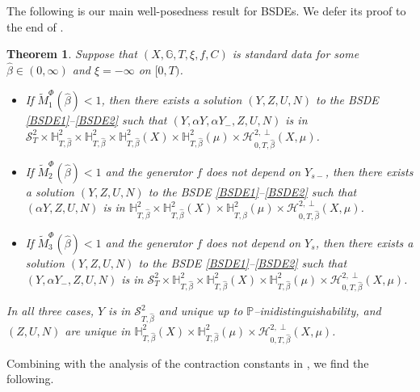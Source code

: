 \documentclass[10pt]{article} %
\newtheorem{theorem}{Theorem}[section]
\newcommand\cH{\mathcal H}
\newcommand\cS{\mathcal S}
\def \G{\mathbb{G}}
\def \H{\mathbb{H}}
\def \P{\mathbb{P}}
\newcommand{\1}{\mathbf{1}}
\begin{document}
The following is our main well-posedness result for BSDEs. We defer its proof to the end of .


\begin{theorem}\label{thm::main_bsde}
	Suppose that $(X,\G,T,\xi,f,C)$ is standard data for some $\hat\beta \in (0,\infty)$ and $\xi = -\infty$ on $[0,T)$.
	
	\begin{itemize}
	\item[$(i)$] If $\widetilde M_1^\Phi(\hat\beta) < 1$, then there exists a solution $(Y,Z,U,N)$ to the {\rm BSDE} \ref{BSDE1}--\ref{BSDE2} such that $(Y,\alpha Y,\alpha Y_-,Z,U,N)$ is in $\cS^2_T \times \H^2_{T,\hat\beta} \times \H^2_{T,\hat\beta} \times \H^2_{T,\hat\beta}(X) \times \H^2_{T,\hat\beta}(\mu) \times \cH^{2,\perp}_{0,T,\hat\beta}(X,\mu)$. %
	
	
	\item[$(ii)$] If $\widetilde M_2^\Phi(\hat\beta) < 1$ and the generator $f$ does not depend on $Y_{s-}$, then there exists a solution $(Y,Z,U,N)$ to the {\rm BSDE} \ref{BSDE1}--\ref{BSDE2} such that $(\alpha Y,Z,U,N)$ is in $\H^2_{T,\hat\beta} \times \H^2_{T,\hat\beta}(X) \times \H^2_{T,\hat\beta}(\mu) \times \cH^{2,\perp}_{0,T,\hat\beta}(X,\mu)$. %


	\item[$(iii)$] If $\widetilde M_3^\Phi(\hat\beta) < 1$ and the generator $f$ does not depend on $Y_s$, then there exists a solution $(Y,Z,U,N)$ to the {\rm BSDE} \ref{BSDE1}--\ref{BSDE2} such that $(Y,\alpha Y_-,Z,U,N)$ is in $\cS^2_T \times \H^2_{T,\hat\beta} \times \H^2_{T,\hat\beta}(X) \times \H^2_{T,\hat\beta}(\mu) \times \cH^{2,\perp}_{0,T,\hat\beta}(X,\mu)$.
	\end{itemize}
	
	In all three cases, $Y$ is in $\cS^2_{T,\hat\beta}$ and unique up to $\P$--inidistinguishability, and $(Z,U,N)$ are unique in $\H^2_{T,\hat\beta}(X) \times \H^2_{T,\hat\beta}(\mu) \times \cH^{2,\perp}_{0,T,\hat\beta}(X,\mu)$.
\end{theorem}

Combining  with the analysis of the contraction constants in , we find the following.
\end{document}
